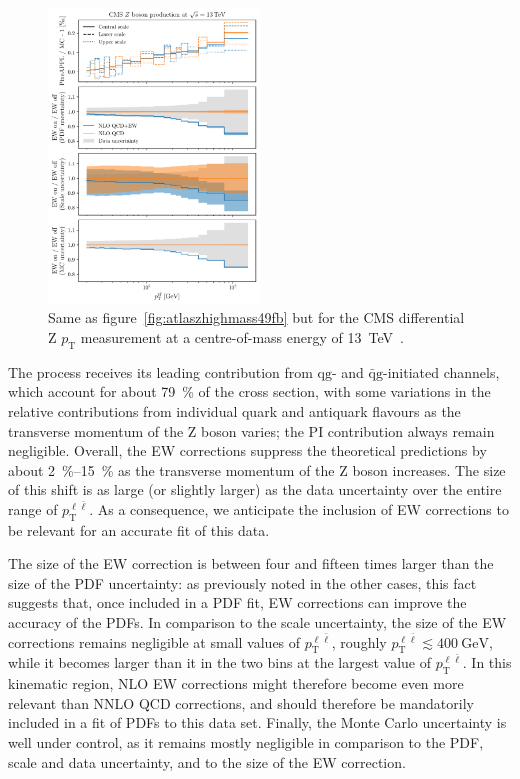 \begin{figure}[!t]
    \centering
    \includegraphics[width=0.5\textwidth]{figures/pineappl_CMS_Z_13_TEV_dyn}
    \caption{Same as figure~\ref{fig:atlaszhighmass49fb} but for the 
      CMS differential Z $p_\mathrm{T}$ measurement at a centre-of-mass energy of
      \SI{13}{\tera\electronvolt}~\cite{Sirunyan:2019bzr}.}
    \label{fig:cmsZ13TeV}
\end{figure}

The process receives its leading contribution from $\mathrm{qg}$- and
$\bar{\mathrm{q}}\mathrm{g}$-initiated channels, which account for about \SI{79}{\percent}
of the cross section, with some variations in the relative contributions from
individual quark and antiquark flavours as the transverse momentum of the
Z boson varies; the PI contribution always remain negligible.
Overall, the EW corrections suppress the theoretical predictions by about
\SIrange{2}{15}{\percent} as the transverse momentum of the Z boson increases.
The size of this shift is as large (or slightly larger) as the data uncertainty over
the entire range of $p_{\mathrm{T}}^{\ell\bar\ell}$. As a consequence,
we anticipate the inclusion of EW corrections to be relevant for an accurate
fit of this data.

The size of the EW correction is between four and fifteen times larger than the
size of the PDF uncertainty: as previously noted in the other cases, this fact
suggests that, once included in a PDF fit, EW corrections can improve the
accuracy of the PDFs. In comparison to the scale uncertainty, the size of the
EW corrections remains negligible at small values of $p_{\mathrm{T}}^{\ell\bar\ell}$,
roughly $p_{\mathrm{T}}^{\ell\bar\ell}\lesssim\SI{400}{\giga\electronvolt}$, while it
becomes larger than it in the two bins at the largest value of
$p_{\mathrm{T}}^{\ell\bar\ell}$. In this kinematic region, NLO EW corrections might
therefore become even more relevant than NNLO QCD corrections, and should
therefore be mandatorily included in a fit of PDFs to this data set.
Finally, the Monte Carlo uncertainty is well under control, as it remains
mostly negligible in comparison to the PDF, scale and data uncertainty, and to
the size of the EW correction.

